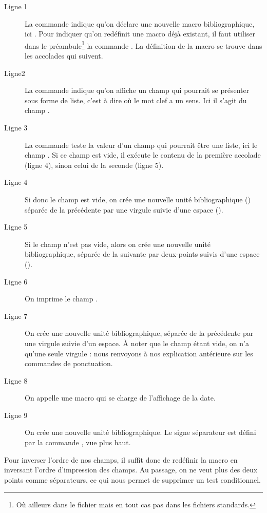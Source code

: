 \begin{description}
\item[Ligne 1] La commande  indique qu'on déclare une nouvelle macro bibliographique, ici . Pour indiquer qu'on redéfinit une macro déjà existant, il faut utiliser dans le préambule\footnote{Où ailleurs dans le fichier  mais en tout cas pas dans les fichiers standards.} la commande . La définition de la macro se trouve dans les accolades qui suivent.
\item[Ligne2] La commande  indique qu'on affiche un champ qui pourrait se présenter sous forme de liste, c'est à dire où le mot clef  a un sens. Ici il s'agit du champ .
\item[Ligne 3] La commande  teste la valeur d'un champ qui pourrait être une liste, ici le champ . Si ce champ est vide, il exécute le contenu de la première accolade (ligne 4), sinon celui de la seconde (ligne 5).
\item[Ligne 4] Si donc le champ  est vide, on crée une nouvelle unité bibliographique ()\label{unitepersonalisee} séparée de la précédente par une virgule suivie d'une espace ().
\item[Ligne 5] Si le champ  n'est pas vide, alors on crée une nouvelle unité bibliographique, séparée de la suivante par deux-points suivis d'une espace ().
\item[Ligne 6] On imprime le champ .
\item[Ligne 7] On crée une nouvelle unité bibliographique, séparée de la précédente par une virgule suivie d'un espace. À noter que le champ  étant vide, on n'a qu'une seule virgule : nous renvoyons à nos explication antérieure sur les commandes de ponctuation.
\item[Ligne 8] On appelle une macro qui se charge de l'affichage de la date.
\item[Ligne 9] On crée une nouvelle unité bibliographique. Le signe séparateur est défini par la commande , vue plus haut.
\end{description}

Pour inverser l'ordre de nos champs, il suffit donc de redéfinir la macro en inversant l'ordre d'impression des champs. Au passage, on ne veut plus des deux points comme séparateurs, ce qui nous permet de supprimer un test conditionnel.


